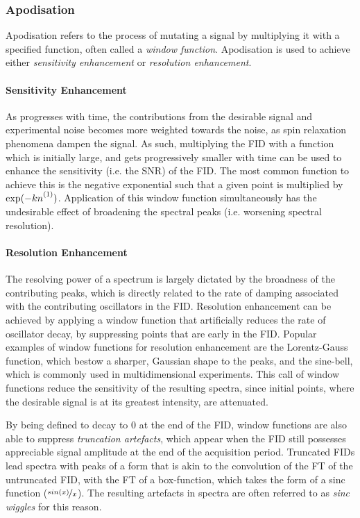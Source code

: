 \subsubsection{Apodisation}
Apodisation refers to the process of mutating a signal by multiplying it with a
specified function, often called a \emph{window function}. Apodisation is used to achieve either \emph{sensitivity enhancement} or \emph{resolution enhancement}.

\paragraph{Sensitivity Enhancement} As  progresses with time, the
contributions from the desirable signal and experimental noise becomes more
weighted towards the noise, as spin relaxation phenomena dampen the signal. As
such, multiplying the \ac{FID} with a function which is initially large, and
gets progressively smaller with time can be used to enhance the sensitivity
(i.e. the \ac{SNR}) of the \ac{FID}. The most common function to achieve this
is the negative exponential such that a given point is multiplied by $\exp(-k
\none)$. Application of this window function
simultaneously has the undesirable effect of broadening the spectral peaks (i.e. worsening spectral resolution).

\paragraph{Resolution Enhancement} The resolving power of a spectrum is largely
dictated by the broadness of the contributing peaks, which is directly related
to the rate of damping associated with the contributing oscillators in the
\ac{FID}. Resolution enhancement can be achieved by applying a window function
that artificially reduces the rate of oscillator decay, by suppressing points
that are early in the \ac{FID}. Popular examples of window functions for
resolution enhancement are the Lorentz-Gauss function, which bestow a sharper,
Gaussian shape to the peaks, and the sine-bell, which is commonly used in
multidimensional experiments. This call of window functions reduce the sensitivity of
the resulting spectra, since initial points, where the desirable signal is at
its greatest intensity, are attenuated.

By being defined to decay to $0$ at the end of the \ac{FID}, window functions
are also able to suppress \emph{truncation artefacts}, which appear when the
\ac{FID} still possesses appreciable signal amplitude at the end of the
acquisition period. Truncated \acp{FID} lead spectra with peaks of a form that is akin to the convolution of the \ac{FT} of the untruncated \ac{FID}, with the
\ac{FT} of a box-function, which takes the form of a sinc function ($\nicefrac{sin(x)}{x}$). The resulting artefacts in spectra are often referred to as \emph{sinc wiggles} for this reason.

